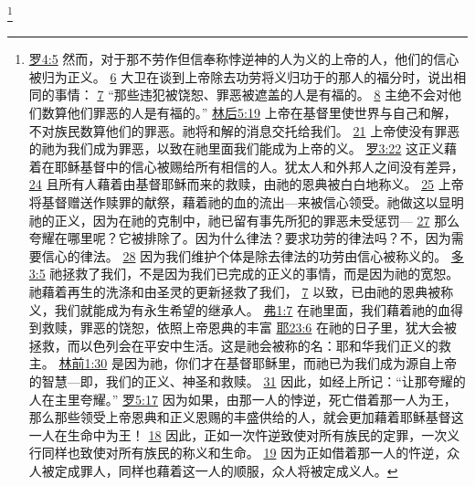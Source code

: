 \documentclass[12pt, a4paper, oneside]{ctexart}
\begin{document}
	\footnote {
		\href{https://biblehub.com/romans/4-5.htm}{罗4:5} 然而，对于那不劳作但信奉称悖逆神的人为义的上帝的人，他们的信心被归为正义。
		\href{https://biblehub.com/romans/4-6.htm}{6} 大卫在谈到上帝除去功劳将义归功于的那人的福分时，说出相同的事情：
		\href{https://biblehub.com/romans/4-7.htm}{7} “那些违犯被饶恕、罪恶被遮盖的人是有福的。
		\href{https://biblehub.com/romans/4-8.htm}{8} 主绝不会对他们数算他们罪恶的人是有福的。”
		\href{https://biblehub.com/2_corinthians/5-19.htm}{林后5:19} 上帝在基督里使世界与自己和解，不对族民数算他们的罪恶。祂将和解的消息交托给我们。
		\href{https://biblehub.com/2_corinthians/5-21.htm}{21} 上帝使没有罪恶的祂为我们成为罪恶，以致在祂里面我们能成为上帝的义。
		\href{https://biblehub.com/romans/3-22.htm}{罗3:22} 这正义藉着在耶稣基督中的信心被赐给所有相信的人。犹太人和外邦人之间没有差异，
		\href{https://biblehub.com/romans/3-24.htm}{24} 且所有人藉着由基督耶稣而来的救赎，由祂的恩典被白白地称义。
		\href{https://biblehub.com/romans/3-25.htm}{25} 上帝将基督赠送作赎罪的献祭，藉着祂的血的流出---来被信心领受。祂做这以显明祂的正义，因为在祂的克制中，祂已留有事先所犯的罪恶未受惩罚---
		\href{https://biblehub.com/romans/3-27.htm}{27} 那么夸耀在哪里呢？它被排除了。因为什么律法？要求功劳的律法吗？不，因为需要信心的律法。
		\href{https://biblehub.com/romans/3-28.htm}{28} 因为我们维护个体是除去律法的功劳由信心被称义的。
		\href{https://biblehub.com/titus/3-5.htm}{多3:5} 祂拯救了我们，不是因为我们已完成的正义的事情，而是因为祂的宽恕。祂藉着再生的洗涤和由圣灵的更新拯救了我们，
		\href{https://biblehub.com/titus/3-7.htm}{7} 以致，已由祂的恩典被称义，我们就能成为有永生希望的继承人。
        \href{https://biblehub.com/ephesians/1-7.htm}{弗1:7} 在祂里面，我们藉着祂的血得到救赎，罪恶的饶恕，依照上帝恩典的丰富
		\href{https://biblehub.com/jeremiah/23-6.htm}{耶23:6} 在祂的日子里，犹大会被拯救，而以色列会在平安中生活。这是祂会被称的名：耶和华我们正义的救主。
		\href{https://biblehub.com/1_corinthians/1-30.htm}{林前1:30} 是因为祂，你们才在基督耶稣里，而祂已为我们成为源自上帝的智慧---即，我们的正义、神圣和救赎。
		\href{https://biblehub.com/1_corinthians/1-31.htm}{31} 因此，如经上所记：“让那夸耀的人在主里夸耀。”
        \href{https://biblehub.com/romans/5-17.htm}{罗5:17} 因为如果，由那一人的悖逆，死亡借着那一人为王，那么那些领受上帝恩典和正义恩赐的丰盛供给的人，就会更加藉着耶稣基督这一人在生命中为王！
		\href{https://biblehub.com/romans/5-18.htm}{18} 因此，正如一次忤逆致使对所有族民的定罪，一次义行同样也致使对所有族民的称义和生命。
		\href{https://biblehub.com/romans/5-19.htm}{19} 因为正如借着那一人的忤逆，众人被定成罪人，同样也藉着这一人的顺服，众人将被定成义人。
	}
\end{document}

